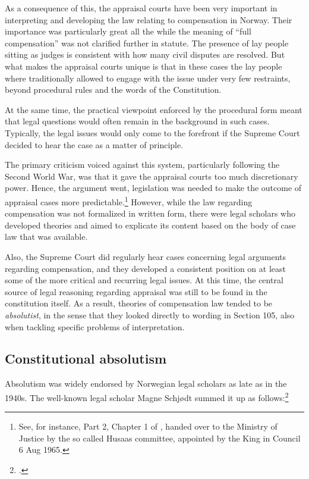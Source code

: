 As a consequence of this, the appraisal courts have been very important in interpreting and developing the law relating to compensation in Norway. Their importance was particularly great all the while the meaning of ``full compensation'' was not clarified further in statute. The presence of lay people sitting as judges is consistent with how many civil disputes are resolved. But what makes the appraisal courts unique is that in these cases the lay people where traditionally allowed to engage with the issue under very few restraints, beyond procedural rules and the words of the Constitution.

At the same time, the practical viewpoint enforced by the procedural form meant that legal questions would often remain in the background in such cases. Typically, the legal issues would only come to the forefront if the Supreme Court decided to hear the case as a matter of principle. 

The primary criticism voiced against this system, particularly following the Second World War, was that it gave the appraisal courts too much discretionary power. Hence, the argument went, legislation was needed to make the outcome of appraisal cases more predictable.\footnote{See, for instance, Part 2, Chapter 1 of \cite{nut69}, handed over to the Ministry of Justice by the so called Husaas committee, appointed by the King in Council 6 Aug 1965.} However, while the law regarding compensation was not formalized in written form, there were legal scholars who developed theories and aimed to explicate its content based on the body of case law that was available.

Also, the Supreme Court did regularly hear cases concerning legal arguments regarding compensation, and they developed a consistent position on at least some of the more critical and recurring legal issues. At this time, the central source of legal reasoning regarding appraisal was still to be found in the constitution itself. As a result, theories of compensation law tended to be \emph{absolutist}, in the sense that they looked directly to wording in Section 105, also when tackling specific problems of interpretation. 

\subsection{Constitutional absolutism}

Absolutism was widely endorsed by Norwegian legal scholars as late as in the 1940s. The well-known legal scholar Magne Schjødt summed it up as follows:\footcite[177]{schjodt47}

